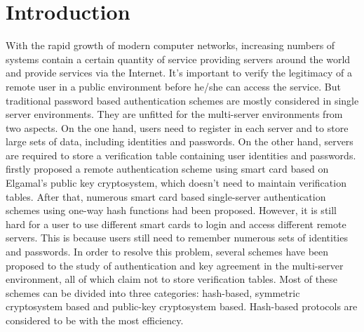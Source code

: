 \documentclass[preprint,12pt]{elsarticle}
\begin{document}
\section{Introduction}
\label{}
With the rapid growth of modern computer networks, increasing numbers of systems contain a certain quantity of service providing servers around the world and provide services via the Internet. It's important to verify the legitimacy of a remote user in a public environment before he/she can access the service. But traditional password based authentication schemes are mostly considered in single server environments. They are unfitted for the multi-server environments from two aspects. On the one hand, users need to register in each server and to store large sets of data, including identities and passwords.  On the other hand, servers are required to store a verification table containing user identities and passwords. \cite{Hwang-Li} firstly proposed a remote authentication scheme using smart card based on Elgamal's public key cryptosystem\cite{Elgamal}, which doesn't need to maintain verification tables. After that, numerous smart card based single-server authentication schemes using one-way hash functions had been proposed\cite{passwd-based-single1,passwd-based-single2, passwd-based-single3, passwd-based-single4,passwd-based-single5, passwd-based-single6,passwd-based-single7}. However, it is still hard for a user to use different smart cards to login and access different remote servers. This is because users still need to remember numerous sets of identities and passwords. In order to resolve this problem, several schemes have been proposed to the study of authentication and key agreement in the multi-server environment\cite{passwd-based-multi1,passwd-based-multi2,passwd-based-multi3,passwd-based-multi4,passwd-based-multi5,passwd-based-multi6, passwd-based-multi7}, all of which claim not to store verification tables. Most of these schemes can be divided into three categories: hash-based, symmetric cryptosystem based and public-key cryptosystem based. Hash-based protocols are considered to be with the most efficiency.
\end{document}
